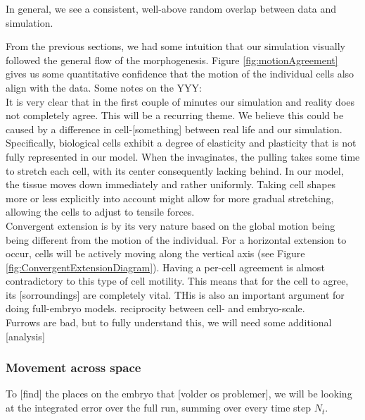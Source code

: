 In general, we see a consistent, well-above random overlap between data and simulation. 

From the previous sections, we had some intuition that our simulation visually followed the general flow of the morphogenesis. Figure \ref{fig:motionAgreement} gives us some quantitative confidence that the motion of the individual cells also align with the data. 
Some notes on the YYY:\\

It is very clear that in the first couple of minutes our simulation and reality does not completely agree. This will be a recurring theme. We believe this could be caused by a difference in cell-[something] between real life and our simulation. Specifically, biological cells exhibit a degree of elasticity and plasticity that is not fully represented in our model. When the  invaginates, the pulling takes some time to stretch each cell, with its center consequently lacking behind. In our model, the tissue moves down immediately and rather uniformly. Taking cell shapes more or less explicitly into account might allow for more gradual stretching, allowing the cells to adjust to tensile forces.\\

Convergent extension is by its very nature based on the global motion being being different from the motion of the individual. For a horizontal extension to occur, cells will be actively moving along the vertical axis (see Figure \ref{fig:ConvergentExtensionDiagram}). Having a per-cell agreement is almost contradictory to this type of cell motility. This means that for the cell to agree, its [sorroundings] are completely vital. THis is also an important argument for doing full-embryo models. reciprocity between cell- and embryo-scale.
\\

 

Furrows are bad, but to fully understand this, we will need some additional [analysis]\\

\subsubsection{Movement across space}

To [find] the places on the embryo that [volder os problemer], we will be looking at the integrated error over the full run, summing over every time step $N_t$.


